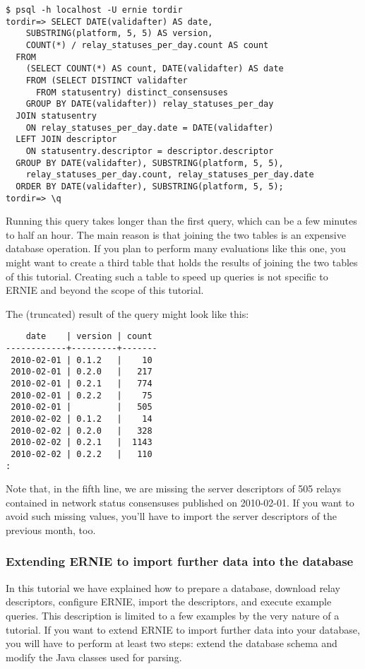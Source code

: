 \documentclass{article}
\begin{document}
\begin{verbatim}
$ psql -h localhost -U ernie tordir
tordir=> SELECT DATE(validafter) AS date,
    SUBSTRING(platform, 5, 5) AS version,
    COUNT(*) / relay_statuses_per_day.count AS count
  FROM
    (SELECT COUNT(*) AS count, DATE(validafter) AS date
    FROM (SELECT DISTINCT validafter
      FROM statusentry) distinct_consensuses
    GROUP BY DATE(validafter)) relay_statuses_per_day
  JOIN statusentry
    ON relay_statuses_per_day.date = DATE(validafter)
  LEFT JOIN descriptor
    ON statusentry.descriptor = descriptor.descriptor
  GROUP BY DATE(validafter), SUBSTRING(platform, 5, 5),
    relay_statuses_per_day.count, relay_statuses_per_day.date
  ORDER BY DATE(validafter), SUBSTRING(platform, 5, 5);
tordir=> \q
\end{verbatim}

Running this query takes longer than the first query, which can be a few
minutes to half an hour.
The main reason is that joining the two tables is an expensive database
operation.
If you plan to perform many evaluations like this one, you might want to
create a third table that holds the results of joining the two tables of
this tutorial.
Creating such a table to speed up queries is not specific to ERNIE and
beyond the scope of this tutorial.

The (truncated) result of the query might look like this:

\begin{verbatim}
    date    | version | count
------------+---------+-------
 2010-02-01 | 0.1.2   |    10
 2010-02-01 | 0.2.0   |   217
 2010-02-01 | 0.2.1   |   774
 2010-02-01 | 0.2.2   |    75
 2010-02-01 |         |   505
 2010-02-02 | 0.1.2   |    14
 2010-02-02 | 0.2.0   |   328
 2010-02-02 | 0.2.1   |  1143
 2010-02-02 | 0.2.2   |   110
:
\end{verbatim}

Note that, in the fifth line, we are missing the server descriptors of 505
relays contained in network status consensuses published on 2010-02-01.
If you want to avoid such missing values, you'll have to import the server
descriptors of the previous month, too.

\subsubsection{Extending ERNIE to import further data into the database}

In this tutorial we have explained how to prepare a database, download
relay descriptors, configure ERNIE, import the descriptors, and execute
example queries.
This description is limited to a few examples by the very nature of a
tutorial.
If you want to extend ERNIE to import further data into your database,
you will have to perform at least two steps:
extend the database schema and modify the Java classes used for parsing.
\end{document}
